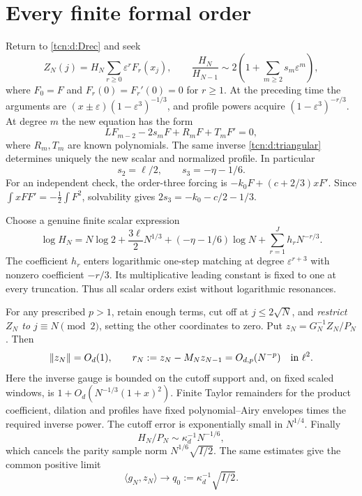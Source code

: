 \documentclass[11pt,letterpaper]{article}
\newcommand{\norm}[1]{\left\lVert#1\right\rVert}
\newcommand{\ip}[2]{\langle#1,#2\rangle}
\newcommand{\eps}{\varepsilon}
\theoremstyle{remark}
\begin{document}
\section{Every finite formal order}\label{tcn:d:sec:formal}
Return to \eqref{tcn:d:Drec} and seek
\begin{equation}\label{tcn:d:formal}
 Z_N(j)=H_N\sum_{r\ge0}\eps^rF_r(x_j),\qquad
 \frac{H_N}{H_{N-1}}\sim2\left(1+\sum_{m\ge2}s_m\eps^m\right),
\end{equation}
where $F_0=F$ and $F_r(0)=F_r'(0)=0$ for $r\ge1$. At the preceding time the arguments are $(x\pm\eps)(1-\eps^3)^{-1/3}$, and profile powers acquire $(1-\eps^3)^{-r/3}$. At degree $m$ the new equation has the form
\[
 LF_{m-2}-2s_mF+R_mF+T_mF'=0,
\]
where $R_m,T_m$ are known polynomials. The same inverse \eqref{tcn:d:triangular} determines uniquely the new scalar and normalized profile. In particular
\[
 s_2=\ell/2,\qquad s_3=-\eta-1/6.
\]
For an independent check, the order-three forcing is $-k_0F+(c+2/3)xF'$. Since $\int xFF'=-\frac12\int F^2$, solvability gives $2s_3=-k_0-c/2-1/3$.

Choose a genuine finite scalar expression
\begin{equation}\label{tcn:d:H}
 \log H_N=N\log2+\frac{3\ell}2N^{1/3}
       +(-\eta-1/6)\log N+\sum_{r=1}^J h_rN^{-r/3}.
\end{equation}
The coefficient $h_r$ enters logarithmic one-step matching at degree $\eps^{r+3}$ with nonzero coefficient $-r/3$. Its multiplicative leading constant is fixed to one at every truncation. Thus all scalar orders exist without logarithmic resonances.

For any prescribed $p>1$, retain enough terms, cut off at $j\le2\sqrt N$, and \emph{restrict $Z_N$ to $j\equiv N\pmod2$}, setting the other coordinates to zero. Put $z_N=G_N^{-1}Z_N/P_N$. Then
\begin{equation}\label{tcn:d:residual}
 \norm{z_N}=O_d(1),\qquad r_N:=z_N-M_Nz_{N-1}=O_{d,p}(N^{-p})
 \quad\hbox{in }\ell^2.
\end{equation}
Here the inverse gauge is bounded on the cutoff support and, on fixed scaled windows, is $1+O_d(N^{-1/3}(1+x)^2)$. Finite Taylor remainders for the product coefficient, dilation and profiles have fixed polynomial--Airy envelopes times the required inverse power. The cutoff error is exponentially small in $N^{1/4}$. Finally
\[
 H_N/P_N\sim\kappa_d^{-1}N^{-1/6},
\]
which cancels the parity sample norm $N^{1/6}\sqrt{I/2}$. The same estimates give the common positive limit
\begin{equation}\label{tcn:d:q0}
 \ip{g_N}{z_N}\longrightarrow q_0:=\kappa_d^{-1}\sqrt{I/2}.
\end{equation}
\end{document}
